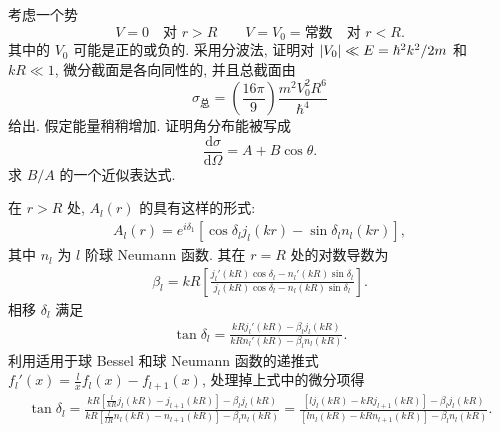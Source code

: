 \documentclass{assignment}
\begin{document}
\begin{prob}[课本习题 6.4]
    考虑一个势
    \[
        V=0\quad\text{对 }r>R\qquad V=V_0=\text{常数}\quad\text{对 }r<R.
    \]
    其中的 $V_0$ 可能是正的或负的. 采用分波法, 证明对 $\left\lvert V_0\right\rvert\ll E=\hbar^2k^2/2m$ 和 $kR\ll 1$, 微分截面是各向同性的, 并且总截面由
    \[
        \sigma_{\text{总}}=\left(\frac{16\pi}{9}\right)\frac{m^2V_0^2R^6}{\hbar^4}
    \]
    给出. 假定能量稍稍增加. 证明角分布能被写成
    \[
        \frac{\mathrm{d}\sigma}{\mathrm{d}\Omega}=A+B\cos\theta.
    \]
    求 $B/A$ 的一个近似表达式.
\end{prob}
\begin{sol}
    在 $r>R$ 处, $A_l(r)$ 的具有这样的形式:
    \begin{align}
        A_l(r)=e^{i\delta_1}[\cos\delta_lj_l(kr)-\sin\delta_ln_l(kr)],
    \end{align}
    其中 $n_l$ 为 $l$ 阶球 Neumann 函数. 其在 $r=R$ 处的对数导数为
    \begin{align}
        \beta_l=kR\left[\frac{j_l'(kR)\cos\delta_l-n_l'(kR)\sin\delta_l}{j_l(kR)\cos\delta_l-n_l(kR)\sin\delta_l}\right].
    \end{align}
    相移 $\delta_l$ 满足
    \begin{align}
        \tan\delta_l=\frac{kRj_l'(kR)-\beta_lj_l(kR)}{kRn_l'(kR)-\beta_ln_l(kR)}.
    \end{align}
    利用适用于球 Bessel 和球 Neumann 函数的递推式 $f_l'(x)=\frac{l}{x}f_l(x)-f_{l+1}(x)$, 处理掉上式中的微分项得
    \begin{align}
        \label{A14-2-phase-shift}
        \tan\delta_l=\frac{kR\left[\frac{l}{kR}j_l(kR)-j_{l+1}(kR)\right]-\beta_lj_l(kR)}{kR\left[\frac{l}{lR}n_l(kR)-n_{l+1}(kR)\right]-\beta_ln_l(kR)}=\frac{\left[lj_l(kR)-kRj_{l+1}(kR)\right]-\beta_lj_l(kR)}{\left[ln_l(kR)-kRn_{l+1}(kR)\right]-\beta_ln_l(kR)}.
    \end{align}


\end{sol}
\end{document}
